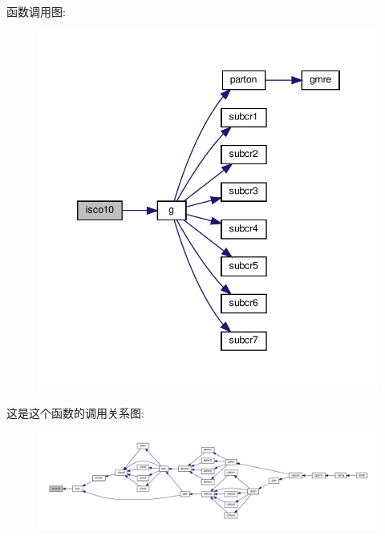 函数调用图\+:
\nopagebreak
\begin{figure}[H]
\begin{center}
\leavevmode
\includegraphics[width=346pt]{isco10_8f90_ab2c4215b937ff36383b5c718de25a706_cgraph}
\end{center}
\end{figure}
这是这个函数的调用关系图\+:
\nopagebreak
\begin{figure}[H]
\begin{center}
\leavevmode
\includegraphics[width=350pt]{isco10_8f90_ab2c4215b937ff36383b5c718de25a706_icgraph}
\end{center}
\end{figure}
